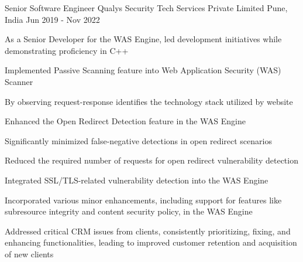 \begin{cventries}
\cventry
{Senior Software Engineer} %
{Qualys Security Tech Services Private Limited} %
{Pune, India} %
{Jun 2019 - Nov 2022} %
{
\begin{cvitems}
\setlength{\itemsep}{1ex} %
%
\item {As a Senior Developer for the WAS Engine, led development initiatives while demonstrating proficiency in C++}
\item {Implemented Passive Scanning feature into Web Application Security (WAS) Scanner}
    \begin{cvitemsnested}
    \item {By observing request-response identifies the technology stack utilized by website}
    \end{cvitemsnested}
\item {Enhanced the Open Redirect Detection feature in the WAS Engine}
    \begin{cvitemsnested}
    \item {Significantly minimized false-negative detections in open redirect scenarios}
    \item {Reduced the required number of requests for open redirect vulnerability detection}
    \end{cvitemsnested}
\item {Integrated SSL/TLS-related vulnerability detection into the WAS Engine}
\item {Incorporated various minor enhancements, including support for features like subresource integrity and content security policy, in the WAS Engine}
\item {Addressed critical CRM issues from clients, consistently prioritizing, fixing, and enhancing functionalities, leading to improved customer retention and acquisition of new clients}
%
\end{cvitems}
}




\end{cventries}
